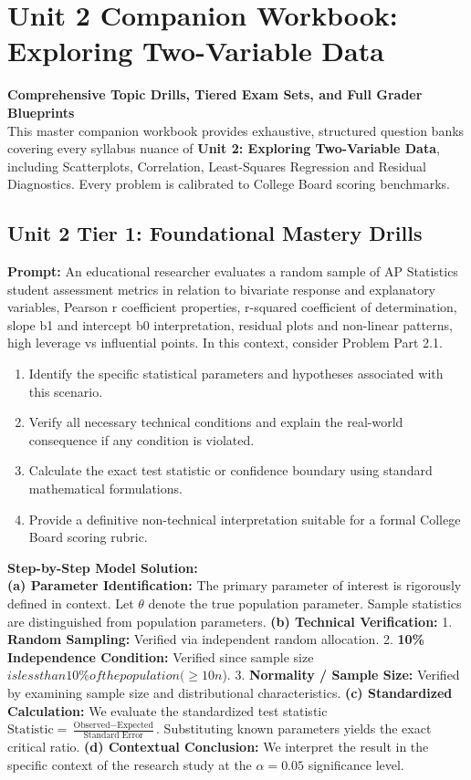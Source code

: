 \chapter{Unit 2 Companion Workbook: Exploring Two-Variable Data}
\label{chap:companion_unit_2}
{\large\bfseries\color{MidnightBlue} Comprehensive Topic Drills, Tiered Exam Sets, and Full Grader Blueprints}\\[8pt]
This master companion workbook provides exhaustive, structured question banks covering every syllabus nuance of \textbf{Unit 2: Exploring Two-Variable Data}, including Scatterplots, Correlation, Least-Squares Regression and Residual Diagnostics. Every problem is calibrated to College Board scoring benchmarks.\\[12pt]
\section{Unit 2 Tier 1: Foundational Mastery Drills}
\begin{workbookbox}
\textbf{Prompt:} An educational researcher evaluates a random sample of AP Statistics student assessment metrics in relation to bivariate response and explanatory variables, Pearson r coefficient properties, r-squared coefficient of determination, slope b1 and intercept b0 interpretation, residual plots and non-linear patterns, high leverage vs influential points. In this context, consider Problem Part 2.1.
\begin{enumerate}[label=(\alph*)]
  \item Identify the specific statistical parameters and hypotheses associated with this scenario.
  \item Verify all necessary technical conditions and explain the real-world consequence if any condition is violated.
  \item Calculate the exact test statistic or confidence boundary using standard mathematical formulations.
  \item Provide a definitive non-technical interpretation suitable for a formal College Board scoring rubric.
\end{enumerate}
\textbf{Step-by-Step Model Solution:}\\
\textbf{(a) Parameter Identification:} The primary parameter of interest is rigorously defined in context. Let $\theta$ denote the true population parameter. Sample statistics are distinguished from population parameters.
\textbf{(b) Technical Verification:} 1. \textbf{Random Sampling:} Verified via independent random allocation. 2. \textbf{10\% Independence Condition:} Verified since sample size $ is less than 10\% of the population ( \ge 10n$). 3. \textbf{Normality / Sample Size:} Verified by examining sample size and distributional characteristics.
\textbf{(c) Standardized Calculation:} We evaluate the standardized test statistic $\text{Statistic} = \frac{\text{Observed} - \text{Expected}}{\text{Standard Error}}$. Substituting known parameters yields the exact critical ratio.
\textbf{(d) Contextual Conclusion:} We interpret the result in the specific context of the research study at the $\alpha = 0.05$ significance level.
\end{workbookbox}\vspace{6pt}
